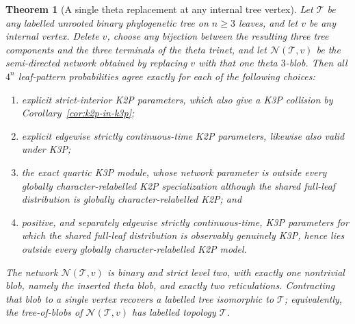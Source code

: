 \documentclass[11pt]{article}
\newtheorem{theorem}{Theorem}\newtheorem{proposition}[theorem]{Proposition}\newtheorem{lemma}[theorem]{Lemma}\newtheorem{corollary}[theorem]{Corollary}
\theoremstyle{remark}\newtheorem{remark}[theorem]{Remark}
\begin{document}
\begin{theorem}[A single theta replacement at any internal tree vertex]\label{thm:single-theta-replacement}
Let $\mathcal T$ be any labelled unrooted binary phylogenetic tree on $n\ge3$ leaves, and let $v$ be any internal vertex. Delete $v$, choose any bijection between the resulting three tree components and the three terminals of the theta trinet, and let $\mathcal N(\mathcal T,v)$ be the semi-directed network obtained by replacing $v$ with that one theta $3$-blob. Then all $4^n$ leaf-pattern probabilities agree exactly for each of the following choices:
\begin{enumerate}[label=(\alph*)]
\item explicit strict-interior K2P parameters, which also give a K3P collision by Corollary~\ref{cor:k2p-in-k3p};
\item explicit edgewise strictly continuous-time K2P parameters, likewise also valid under K3P;
\item the exact quartic K3P module, whose network parameter is outside every globally character-relabelled K2P specialization although the shared full-leaf distribution is globally character-relabelled K2P; and
\item positive, and separately edgewise strictly continuous-time, K3P parameters for which the shared full-leaf distribution is observably genuinely K3P, hence lies outside every globally character-relabelled K2P model.
\end{enumerate}
The network $\mathcal N(\mathcal T,v)$ is binary and strict level two, with exactly one nontrivial blob, namely the inserted theta blob, and exactly two reticulations. Contracting that blob to a single vertex recovers a labelled tree isomorphic to $\mathcal T$; equivalently, the tree-of-blobs of $\mathcal N(\mathcal T,v)$ has labelled topology $\mathcal T$.
\end{theorem}
\end{document}
